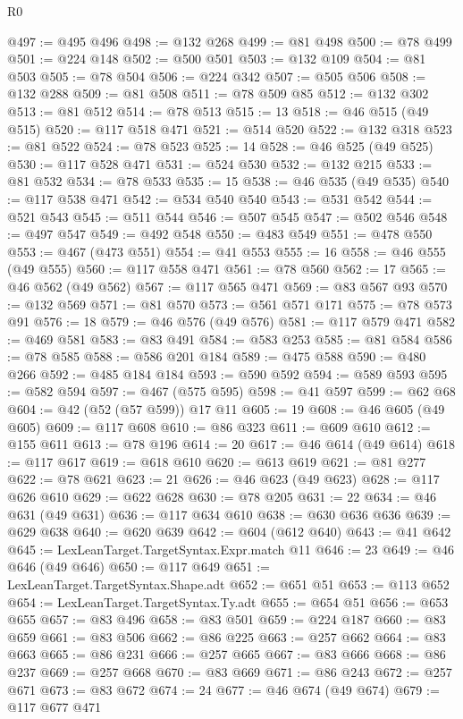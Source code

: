 \begin{lexlean}{R0}
\begin{coremodule}
@497 := @495 @496
@498 := @132 @268
@499 := @81 @498
@500 := @78 @499
@501 := @224 @148
@502 := @500 @501
@503 := @132 @109
@504 := @81 @503
@505 := @78 @504
@506 := @224 @342
@507 := @505 @506
@508 := @132 @288
@509 := @81 @508
@511 := @78 @509 @85
@512 := @132 @302
@513 := @81 @512
@514 := @78 @513
@515 := 13
@518 := @46 @515 (@49 @515)
@520 := @117 @518 @471
@521 := @514 @520
@522 := @132 @318
@523 := @81 @522
@524 := @78 @523
@525 := 14
@528 := @46 @525 (@49 @525)
@530 := @117 @528 @471
@531 := @524 @530
@532 := @132 @215
@533 := @81 @532
@534 := @78 @533
@535 := 15
@538 := @46 @535 (@49 @535)
@540 := @117 @538 @471
@542 := @534 @540 @540
@543 := @531 @542
@544 := @521 @543
@545 := @511 @544
@546 := @507 @545
@547 := @502 @546
@548 := @497 @547
@549 := @492 @548
@550 := @483 @549
@551 := @478 @550
@553 := @467 (@473 @551)
@554 := @41 @553
@555 := 16
@558 := @46 @555 (@49 @555)
@560 := @117 @558 @471
@561 := @78 @560
@562 := 17
@565 := @46 @562 (@49 @562)
@567 := @117 @565 @471
@569 := @83 @567 @93
@570 := @132 @569
@571 := @81 @570
@573 := @561 @571 @171
@575 := @78 @573 @91
@576 := 18
@579 := @46 @576 (@49 @576)
@581 := @117 @579 @471
@582 := @469 @581
@583 := @83 @491
@584 := @583 @253
@585 := @81 @584
@586 := @78 @585
@588 := @586 @201 @184
@589 := @475 @588
@590 := @480 @266
@592 := @485 @184 @184
@593 := @590 @592
@594 := @589 @593
@595 := @582 @594
@597 := @467 (@575 @595)
@598 := @41 @597
@599 := @62 @68
@604 := @42 (@52 (@57 @599)) @17 @11
@605 := 19
@608 := @46 @605 (@49 @605)
@609 := @117 @608
@610 := @86 @323
@611 := @609 @610
@612 := @155 @611
@613 := @78 @196
@614 := 20
@617 := @46 @614 (@49 @614)
@618 := @117 @617
@619 := @618 @610
@620 := @613 @619
@621 := @81 @277
@622 := @78 @621
@623 := 21
@626 := @46 @623 (@49 @623)
@628 := @117 @626 @610
@629 := @622 @628
@630 := @78 @205
@631 := 22
@634 := @46 @631 (@49 @631)
@636 := @117 @634 @610
@638 := @630 @636 @636
@639 := @629 @638
@640 := @620 @639
@642 := @604 (@612 @640)
@643 := @41 @642
@645 := LexLeanTarget.TargetSyntax.Expr.match @11
@646 := 23
@649 := @46 @646 (@49 @646)
@650 := @117 @649
@651 := LexLeanTarget.TargetSyntax.Shape.adt
@652 := @651 @51
@653 := @113 @652
@654 := LexLeanTarget.TargetSyntax.Ty.adt
@655 := @654 @51
@656 := @653 @655
@657 := @83 @496
@658 := @83 @501
@659 := @224 @187
@660 := @83 @659
@661 := @83 @506
@662 := @86 @225
@663 := @257 @662
@664 := @83 @663
@665 := @86 @231
@666 := @257 @665
@667 := @83 @666
@668 := @86 @237
@669 := @257 @668
@670 := @83 @669
@671 := @86 @243
@672 := @257 @671
@673 := @83 @672
@674 := 24
@677 := @46 @674 (@49 @674)
@679 := @117 @677 @471

\end{coremodule}
\end{lexlean}
